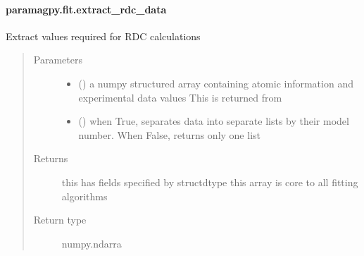\documentclass[a4paper,10pt,english,openany,oneside]{sphinxmanual}
\begin{document}
\paragraph{paramagpy.fit.extract\_rdc\_data}
\label{\detokenize{reference/generated/paramagpy.fit.extract_rdc_data:paramagpy-fit-extract-rdc-data}}\label{\detokenize{reference/generated/paramagpy.fit.extract_rdc_data::doc}}

\begin{fulllineitems}
\label{\detokenize{reference/generated/paramagpy.fit.extract_rdc_data:paramagpy.fit.extract_rdc_data}}
Extract values required for RDC calculations
\begin{quote}\begin{description}
\item[{Parameters}] \leavevmode\begin{itemize}
\item {} 
 () \textendash{} a numpy structured array containing atomic information
and experimental data values
This is returned from
{\hyperref[\detokenize{reference/generated/paramagpy.protein.CustomStructure.parse:paramagpy.protein.CustomStructure.parse}]{}}

\item {} 
 (\sphinxstyleliteralemphasis{\sphinxupquote{, }}) \textendash{} when True, separates data into separate lists
by their model number. When False, returns only one list

\end{itemize}

\item[{Returns}] \leavevmode
{} \textendash{} this has fields specified by structdtype
this array is core to all fitting algorithms

\item[{Return type}] \leavevmode
numpy.ndarra

\end{description}\end{quote}

\end{fulllineitems}
\end{document}
